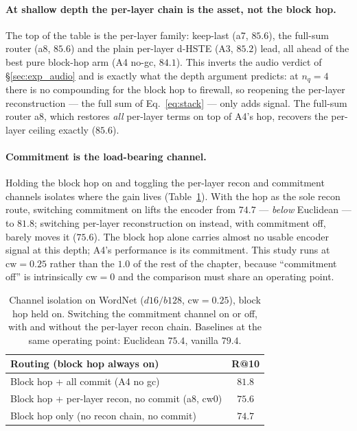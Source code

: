 \documentclass[12pt]{report}
\begin{document}
\paragraph{At shallow depth the per-layer chain is the asset, not the block hop.} The top of the table is the per-layer family: keep-last (a7, $85.6$), the full-sum router (a8, $85.6$) and the plain per-layer d-HSTE (A3, $85.2$) lead, all ahead of the best pure block-hop arm (A4 no-gc, $84.1$). This inverts the audio verdict of \S\ref{sec:exp_audio} and is exactly what the depth argument predicts: at $n_q=4$ there is no compounding for the block hop to firewall, so reopening the per-layer reconstruction --- the full sum of Eq.~\ref{eq:stack} --- only adds signal. The full-sum router a8, which restores \emph{all} per-layer terms on top of A4's hop, recovers the per-layer ceiling exactly ($85.6$).

\paragraph{Commitment is the load-bearing channel.} Holding the block hop on and toggling the per-layer recon and commitment channels isolates where the gain lives (Table~\ref{tab:abl_isolate}). With the hop as the sole recon route, switching commitment on lifts the encoder from $74.7$ --- \emph{below} Euclidean --- to $81.8$; switching per-layer reconstruction on instead, with commitment off, barely moves it ($75.6$). The block hop alone carries almost no usable encoder signal at this depth; A4's performance is its commitment. This study runs at $\text{cw}=0.25$ rather than the $1.0$ of the rest of the chapter, because ``commitment off'' is intrinsically $\text{cw}=0$ and the comparison must share an operating point.

\begin{table}[h]
\centering
\caption{Channel isolation on WordNet ($d16/b128$, $\text{cw}=0.25$), block hop held on. Switching the commitment channel on or off, with and without the per-layer recon chain. Baselines at the same operating point: Euclidean $75.4$, vanilla $79.4$.}
\label{tab:abl_isolate}
\begin{tabular}{lc}
\hline
Routing (block hop always on) & R@10 \\
\hline
Block hop + all commit (A4 no gc) & $81.8$ \\
Block hop + per-layer recon, no commit (a8, cw$0$) & $75.6$ \\
Block hop only (no recon chain, no commit) & $74.7$ \\
\hline
\end{tabular}
\end{table}
\end{document}
